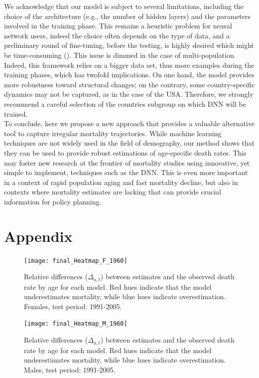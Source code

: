 \documentclass[a4,11pt]{article}
\begin{document}
We acknowledge that our model is subject to several limitations, including the choice of the architecture (e.g., the number of hidden layers) and the parameters involved in the training phase. This remains a heuristic problem for neural network users, indeed the choice often depends on the type of data, and a preliminary round of fine-tuning, before the testing, is highly desired which might be time-consuming (\cite{Nigri}). 
This issue is dimmed in the case of multi-population. Indeed, this framework relies on a bigger data set, thus more examples during the training phases, which has twofold implications. 
On one hand, the model provides more robustness toward structural changes; on the contrary, some country-specific dynamics may not be captured, as in the case of the USA. Therefore, we strongly recommend a careful selection of the countries subgroup on which DNN will be trained.\\
To conclude, here we propose a new approach that provides a valuable alternative tool to capture irregular mortality trajectories. While machine learning techniques are not widely used in the field of demography, our method shows that they can be used to provide robust estimations of age-specific death rates. This may foster new research at the frontier of mortality studies using innovative, yet simple to implement, techniques such as the DNN. This is even more important in a context of rapid population aging and fast mortality decline, but also in contexts where mortality estimates are lacking that can provide crucial information for policy planning.





\appendix
\section{Appendix}
\label{appendix:a}
\setcounter{figure}{0}

\begin{figure}[H]
	\centering
	\texttt{[image: final\_Heatmap\_F\_1960]}\\
	 \caption{Relative differences ($\Delta_{a,t}$) between estimates and the observed death rate by age for each model. Red hues indicate that the model underestimates mortality, while blue hues indicate overestimation. Females, test period: 1991-2005.}
	 \label{A:1}
\end{figure}


\begin{figure}[H]
	\centering
	\texttt{[image: final\_Heatmap\_M\_1960]}\\
	 \caption{Relative differences ($\Delta_{a,t}$) between estimates and the observed death rate by age for each model. Red hues indicate that the model underestimates mortality, while blue hues indicate overestimation. Males, test period: 1991-2005.}
	 \label{A:2}
\end{figure}
\end{document}
